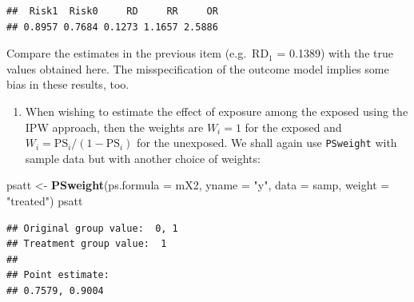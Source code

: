 \documentclass[
]{book}
\newenvironment{Shaded}{\begin{snugshade}}{\end{snugshade}}
\newcommand{\AttributeTok}[1]{\textcolor[rgb]{0.13,0.29,0.53}{#1}}
\newcommand{\DecValTok}[1]{\textcolor[rgb]{0.00,0.00,0.81}{#1}}
\newcommand{\FunctionTok}[1]{\textcolor[rgb]{0.13,0.29,0.53}{\textbf{#1}}}
\newcommand{\NormalTok}[1]{#1}
\newcommand{\OtherTok}[1]{\textcolor[rgb]{0.56,0.35,0.01}{#1}}
\newcommand{\SpecialCharTok}[1]{\textcolor[rgb]{0.81,0.36,0.00}{\textbf{#1}}}
\newcommand{\StringTok}[1]{\textcolor[rgb]{0.31,0.60,0.02}{#1}}
\providecommand{\tightlist}{%
  \setlength{\itemsep}{0pt}\setlength{\parskip}{0pt}}
\theoremstyle{definition}
\theoremstyle{definition}
\theoremstyle{definition}
\theoremstyle{definition}
\theoremstyle{remark}
\begin{document}
\begin{Shaded}
\end{Shaded}

\begin{verbatim}
##  Risk1  Risk0     RD     RR     OR 
## 0.8957 0.7684 0.1273 1.1657 2.5886
\end{verbatim}

Compare the estimates in the previous item (e.g.~RD\(_1\) = 0.1389) with
the true values obtained here. The misspecification of the outcome model
implies some bias in these results, too.

\begin{enumerate}
\def\labelenumi{\arabic{enumi}.}
\setcounter{enumi}{3}
\tightlist
\item
  When wishing to estimate the effect of exposure among the exposed
  using the IPW approach, then the weights are \(W_i = 1\) for the
  exposed and \(W_i = \text{PS}_i/(1-\text{PS}_i)\) for the unexposed.
  We shall again use \texttt{PSweight} with sample data but with another
  choice of weights:
\end{enumerate}

\begin{Shaded}
\begin{Highlighting}[]
\NormalTok{psatt }\OtherTok{\textless{}{-}} \FunctionTok{PSweight}\NormalTok{(}\AttributeTok{ps.formula =}\NormalTok{ mX2, }\AttributeTok{yname =} \StringTok{"y"}\NormalTok{, }
                  \AttributeTok{data =}\NormalTok{ samp, }\AttributeTok{weight =} \StringTok{"treated"}\NormalTok{)}
\NormalTok{psatt}
\end{Highlighting}
\end{Shaded}

\begin{verbatim}
## Original group value:  0, 1 
## Treatment group value:  1 
## 
## Point estimate: 
## 0.7579, 0.9004
\end{verbatim}
\end{document}
